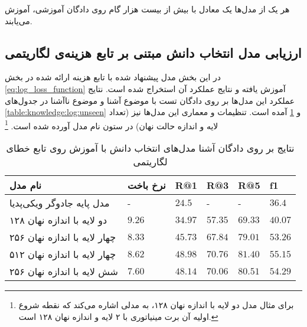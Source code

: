 هر یک از مدل‌ها یک 
معادل با بیش از بیست هزار گام روی دادگان آموزشی، آموزش می‌یابند.

\subsection{ارزیابی مدل انتخاب دانش مبتنی بر تابع هزینه‌ی لگاریتمی }
\label{chap5:log_eval}
در این بخش مدل‌ پیشنهاد شده با تابع هزینه ارائه شده در بخش 
\ref{eq:log_loss_function}
آموزش یافته و نتایج عملکرد آن استخراج شده است. نتایج عملکرد این مدل‌ها بر روی دادگان تست با موضوع آشنا و موضوع ناآشنا در جدول‌های 
\ref{table:knowledge:log:unseen}
و 
\ref{table:knowledge:log:seen}
آمده است. تنظیمات و معماری این مدل‌ها نیز (تعداد لایه و اندازه حالت نهان) در ستون نام مدل آورده شده است.
\footnote{برای مثال مدل دو لایه با اندازه نهان ۱۲۸، به مدلی اشاره می‌کند که نقطه شروع اولیه آن برت مینیاتوری با ۲ لایه و اندازه نهان ۱۲۸ است.}

\begin{table}[h]
	\caption{نتایج بر روی دادگان آشنا مدل‌های انتخاب دانش با آموزش روی تابع خطای لگاریتمی }
	\centering
	\label{table:knowledge:log:seen}
	\begin{tabular}{|l|l|l|l|l|l|}
		\hline
		نام مدل                      & نرخ باخت        & R@1              & R@3              & R@5              & f1               \\ \hline
		مدل پایه جادوگر ویکی‌پدیا    & -               & $24.5$           & -                & -                & $36.4$           \\ \hline
		دو لایه با اندازه نهان ۱۲۸   & $9.26$          & $34.97$          & $57.35$          & $69.33$          & $40.07$          \\ \hline
		چهار لایه با اندازه نهان ۲۵۶ & $8.33$          & $45.73$          & $67.84$          & $79.01$          & $53.26$          \\ \hline
		چهار لایه با اندازه نهان ۵۱۲ & $8.62$          & $\mathbf{48.98}$ & $\mathbf{70.76}$ & $\mathbf{81.40}$ & $\mathbf{55.15}$ \\ \hline
		شش لایه با اندازه نهان ۲۵۶   & $\mathbf{7.60}$ & $48.14$          & $70.06$          & $80.51$          & $54.29$          \\ \hline
	\end{tabular}
\end{table}

